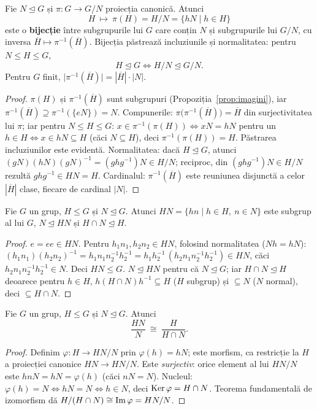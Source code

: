 \begin{teorema}\label{teo:corespondenta}
Fie $N\trianglelefteq G$ și $\pi:G\to G/N$ proiecția canonică. Atunci
\[
H\ \longmapsto\ \pi(H)=H/N=\{hN\mid h\in H\}
\]
este o \textbf{bijecție} între subgrupurile lui $G$ care conțin $N$ și subgrupurile lui $G/N$, cu inversa $\overline H\mapsto\pi^{-1}(\overline H)$. Bijecția păstrează incluziunile și normalitatea: pentru $N\le H\le G$,
\[
H\trianglelefteq G\iff H/N\trianglelefteq G/N .
\]
Pentru $G$ finit, $\bigl|\pi^{-1}(\overline H)\bigr|=|\overline H|\cdot|N|$.
\end{teorema}

\begin{proof}
$\pi(H)$ și $\pi^{-1}(\overline H)$ sunt subgrupuri (Propoziția~\ref{prop:imagini}), iar $\pi^{-1}(\overline H)\supseteq\pi^{-1}(\{eN\})=N$. Compunerile: $\pi\bigl(\pi^{-1}(\overline H)\bigr)=\overline H$ din surjectivitatea lui $\pi$; iar pentru $N\le H\le G$: $x\in\pi^{-1}(\pi(H))\iff xN=hN$ pentru un $h\in H\iff x\in hN\subseteq H$ (căci $N\subseteq H$), deci $\pi^{-1}(\pi(H))=H$. Păstrarea incluziunilor este evidentă. Normalitatea: dacă $H\trianglelefteq G$, atunci $(gN)(hN)(gN)^{-1}=(ghg^{-1})N\in H/N$; reciproc, din $(ghg^{-1})N\in H/N$ rezultă $ghg^{-1}\in HN=H$. Cardinalul: $\pi^{-1}(\overline H)$ este reuniunea disjunctă a celor $|\overline H|$ clase, fiecare de cardinal $|N|$.
\end{proof}

\begin{lema}\label{lema:HNsubgrup}
Fie $G$ un grup, $H\le G$ și $N\trianglelefteq G$. Atunci $HN=\{hn\mid h\in H,\ n\in N\}$ este subgrup al lui $G$, $N\trianglelefteq HN$ și $H\cap N\trianglelefteq H$.
\end{lema}
\begin{proof}
$e=ee\in HN$. Pentru $h_1n_1,h_2n_2\in HN$, folosind normalitatea ($Nh=hN$):
$(h_1n_1)(h_2n_2)^{-1}=h_1n_1n_2^{-1}h_2^{-1}=h_1h_2^{-1}\,(h_2 n_1n_2^{-1}h_2^{-1})\in HN$,
căci $h_2n_1n_2^{-1}h_2^{-1}\in N$. Deci $HN\le G$. $N\trianglelefteq HN$ pentru că $N\trianglelefteq G$; iar $H\cap N\trianglelefteq H$ deoarece pentru $h\in H$, $h(H\cap N)h^{-1}\subseteq H$ ($H$ subgrup) și $\subseteq N$ ($N$ normal), deci $\subseteq H\cap N$.
\end{proof}

\begin{teorema}\label{teo:izo2}
Fie $G$ un grup, $H\le G$ și $N\trianglelefteq G$. Atunci
\[
\frac{HN}{N}\ \cong\ \frac{H}{H\cap N}.
\]
\end{teorema}
\begin{proof}
Definim $\varphi:H\to HN/N$ prin $\varphi(h)=hN$; este morfism, ca restricție la $H$ a proiecției canonice $HN\to HN/N$. Este \emph{surjectiv}: orice element al lui $HN/N$ este $hnN=hN=\varphi(h)$ (căci $nN=N$). Nucleul: $\varphi(h)=N\iff hN=N\iff h\in N$, deci $\operatorname{Ker}\varphi=H\cap N$. Teorema fundamentală de izomorfism dă $H/(H\cap N)\cong\operatorname{Im}\varphi=HN/N$.
\end{proof}

